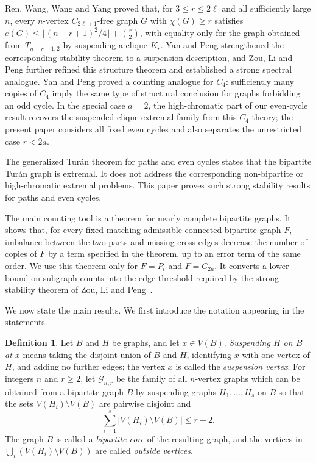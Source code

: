 \documentclass[11pt]{article}
\theoremstyle{definition}
\newtheorem{definition}[theorem]{Definition}
\theoremstyle{plain}
\theoremstyle{remark}
\theoremstyle{plain}
\numberwithin{equation}{section}
\newcommand{\cG}{\mathcal G}
\begin{document}
Ren, Wang, Wang and Yang \cite{RenWangWangYang2024} proved that, for $3\le r\le2\ell$ and all sufficiently large $n$, every $n$-vertex $C_{2\ell+1}$-free graph $G$ with $\chi(G)\ge r$ satisfies $e(G)\le \lfloor(n-r+1)^2/4\rfloor+\binom r2$, with equality only for the graph obtained from $T_{n-r+1,2}$ by suspending a clique $K_r$. Yan and Peng \cite{YanPengStructural2024} strengthened the corresponding stability theorem to a suspension description, and Zou, Li and Peng \cite{ZouLiPeng2025} further refined this structure theorem and established a strong spectral analogue. Yan and Peng \cite{YanPengC42026} proved a counting analogue for $C_4$: sufficiently many copies of $C_4$ imply the same type of structural conclusion for graphs forbidding an odd cycle. In the special case $a=2$, the high-chromatic part of our even-cycle result recovers the suspended-clique extremal family from this $C_4$ theory; the present paper considers all fixed even cycles and also separates the unrestricted case $r<2a$.

The generalized Tur\'an theorem for paths and even cycles states that the bipartite Tur\'an graph is extremal. It does not address the corresponding non-bipartite or high-chromatic extremal problems. This paper proves such strong stability results for paths and even cycles.

The main counting tool is a theorem for nearly complete bipartite graphs. It shows that, for every fixed matching-admissible connected bipartite graph $F$, imbalance between the two parts and missing cross-edges decrease the number of copies of $F$ by a term specified in the theorem, up to an error term of the same order. We use this theorem only for $F=P_t$ and $F=C_{2 a}$. It converts a lower bound on subgraph counts into the edge threshold required by the strong stability theorem of Zou, Li and Peng~\cite{ZouLiPeng2025}.

We now state the main results. We first introduce the notation appearing in the statements.

\begin{definition}\label{def:suspension-family}
Let $B$ and $H$ be graphs, and let $x\in V(B)$. \emph{Suspending $H$ on $B$ at $x$} means taking the disjoint union of $B$ and $H$, identifying $x$ with one vertex of $H$, and adding no further edges; the vertex $x$ is called the \emph{suspension vertex}. For integers $n$ and $r\ge2$, let $\cG_{n,r}$ be the family of all $n$-vertex graphs which can be obtained from a bipartite graph $B$ by suspending graphs $H_1,\ldots,H_s$ on $B$ so that the sets $V(H_i)\setminus V(B)$ are pairwise disjoint and
\[
        \sum_{i=1}^s |V(H_i)\setminus V(B)|\le r-2.
\]
The graph $B$ is called a \emph{bipartite core} of the resulting graph, and the vertices in $\bigcup_i(V(H_i)\setminus V(B))$ are called \emph{outside vertices}.
\end{definition}
\end{document}
